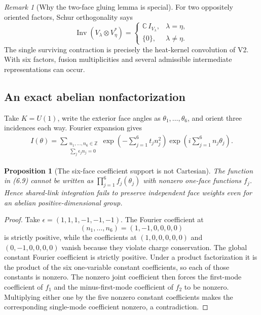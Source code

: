 \documentclass[11pt]{article}
\newtheorem{proposition}[theorem]{Proposition}
\theoremstyle{remark}
\newtheorem{remark}[theorem]{Remark}
\begin{document}
\begin{remark}[Why the two-face gluing lemma is special]
\label{rem:v19v3-two-face}
For two oppositely oriented factors, Schur orthogonality says
\[
 \operatorname{Inv}(V_\lambda\otimes V_\eta^*)=
 \begin{cases}
 \mathbb C\,I_{V_\lambda},&\lambda=\eta,\\
 \{0\},&\lambda\ne\eta.
 \end{cases}                                                \tag{6.8}
\]
The single surviving contraction is precisely the heat-kernel convolution
of V2.  With six factors, fusion multiplicities and several admissible
intermediate representations can occur.
\end{remark}

\subsection{An exact abelian nonfactorization}

Take \(K=U(1)\), write the exterior face angles as
\(\theta_1,\ldots,\theta_6\), and orient three incidences each way.  Fourier
expansion gives
\[
\begin{split}
 I(\theta)
 =\sum_{\substack{n_1,\ldots,n_6\in\mathbb Z\\
                   \sum_j\epsilon_jn_j=0}}
 \exp\left(-\sum_{j=1}^6t_jn_j^2\right)
 \exp\left(i\sum_{j=1}^6n_j\theta_j\right).                \tag{6.9}
\end{split}
\]

\begin{proposition}[The six-face coefficient support is not Cartesian]
\label{prop:v19v3-nonfactor}
The function in (6.9) cannot be written as
\(\prod_{j=1}^6 f_j(\theta_j)\) with nonzero one-face functions \(f_j\).
Hence shared-link integration fails to preserve independent face weights
even for an abelian positive-dimensional group.
\end{proposition}

\begin{proof}
Take \(\epsilon=(1,1,1,-1,-1,-1)\).  The Fourier coefficient at
\[
 (n_1,\ldots,n_6)=(1,-1,0,0,0,0)
\]
is strictly positive, while the coefficients at
\((1,0,0,0,0,0)\) and \((0,-1,0,0,0,0)\) vanish because they violate charge
conservation.  The global constant Fourier coefficient is strictly positive.  Under a
product factorization it is the product of the six one-variable constant
coefficients, so each of those constants is nonzero.  The nonzero joint
coefficient then forces the first-mode coefficient of \(f_1\) and the
minus-first-mode coefficient of \(f_2\) to be nonzero.  Multiplying either
one by the five nonzero constant coefficients makes the corresponding
single-mode coefficient nonzero, a contradiction.
\end{proof}
\end{document}
